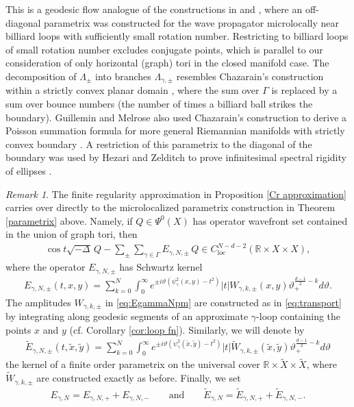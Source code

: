 \documentclass[11pt,letterpaper,oneside]{amsart}
\newcommand{\R}{\mathbb{R}}
\renewcommand{\theta}{\vartheta}
\theoremstyle{definition}
\theoremstyle{remark}
\newtheorem{rema}[theo]{Remark}
\newcommand{\wt}{\widetilde}
\theoremstyle{definition}
\theoremstyle{remark}
\begin{document}
This is a geodesic flow analogue of the constructions in \cite{Vig21} and \cite{Vig22}, where an off-diagonal parametrix was constructed for the wave propagator microlocally near billiard loops with sufficiently small rotation number. Restricting to billiard loops of small rotation number excludes conjugate points, which is parallel to our consideration of only horizontal (graph) tori in the closed manifold case. The decomposition of $\Lambda_\pm$ into branches $\Lambda_{\gamma, \pm}$ resembles Chazarain's construction within a strictly convex planar domain \cite{Ch76}, where the sum over $\Gamma$ is replaced by a sum over bounce numbers (the number of times a billiard ball strikes the boundary). Guillemin and Melrose also used Chazarain's construction to derive a Poisson summation formula for more general Riemannian manifolds with strictly convex boundary \cite{GuMe79b}. A restriction of this parametrix to the diagonal of the boundary was used by Hezari and Zelditch to prove infinitesimal spectral rigidity of ellipses \cite{HeZe12}.

\begin{rema}\label{rem:microlocalCrapproximation}
    The finite regularity approximation in Proposition \ref{Cr approximation} carries over directly to the microlocalized parametrix construction in Theorem \ref{parametrix} above. Namely, if $Q \in \Psi^0(X)$ has operator wavefront set contained in the union of graph tori, then
    \begin{align*}
        \cos t \sqrt{- \Delta} \, Q - \sum_\pm \sum_{\gamma \in \Gamma} E_{\gamma, N, \pm} \,Q \in C_{\text{loc}}^{N - d - 2}(\R \times X \times X),
    \end{align*}
    where the operator $E_{\gamma, N, \pm}$ has Schwartz kernel
    \begin{align}\label{eq:EgammaNpm}
        E_{\gamma, N, \pm}(t,x,y) = \sum_{k = 0}^N \int_0^\infty e^{\pm i \theta (\psi_{\gamma}^2(x,y)  - t^2)} |t| W_{\gamma, k,  \pm} (x,y) \theta_+^{\frac{d-1}{2}-k} d\theta.
    \end{align}
    The amplitudes $W_{\gamma, k , \pm}$ in \eqref{eq:EgammaNpm} are constructed as in \eqref{eq:transport} by integrating along geodesic segments of an approximate $\gamma$-loop containing the points $x$ and $y$ (cf. Corollary \ref{cor:loop fn}). Similarly, we will denote by
    \begin{align}
        \wt E_{\gamma, N, \pm}(t,\wt x, \wt y) = \sum_{k = 0}^N \int_0^\infty e^{\pm i \theta (\psi_{\gamma}^2(\wt x, \wt y)  - t^2)} |t| \wt W_{\gamma, k,  \pm} (\wt x, \wt y) \theta_+^{\frac{d-1}{2}-k} d\theta
    \end{align}
    the kernel of a finite order parametrix on the universal cover $\R \times \wt X \times \wt X$, where $\wt W_{\gamma,k, \pm}$ are constructed exactly as before. Finally, we set
    \begin{align}\label{eq:Egammasumoverpm}
        E_{\gamma,N} = E_{\gamma,N,+} + E_{\gamma,N,-} \qquad \text{and} \qquad \wt E_{\gamma,N} = \wt E_{\gamma,N,+} + \wt E_{\gamma,N,-}.
    \end{align}
\end{rema}
\end{document}
